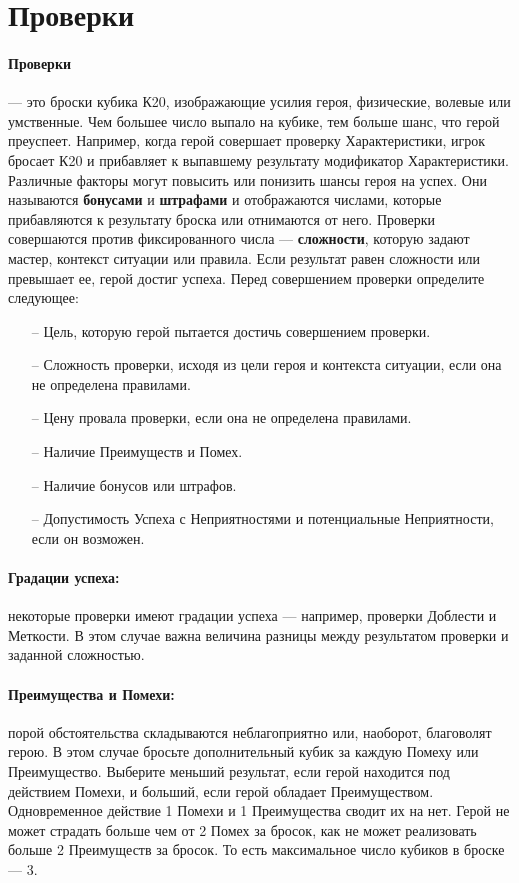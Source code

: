 \section{Проверки}
\paragraph{Проверки} — это броски кубика К20, изображающие усилия героя, физические, волевые или умственные. Чем большее число выпало на кубике, тем больше шанс, что герой преуспеет. Например, когда герой совершает проверку Характеристики, игрок бросает К20 и прибавляет к выпавшему результату модификатор Характеристики. Различные факторы могут повысить или понизить шансы героя на успех. Они называются \textbf{бонусами} и \textbf{штрафами} и отображаются числами, которые прибавляются к результату броска или отнимаются от него.
\newline Проверки совершаются против фиксированного числа — \textbf{сложности}, которую задают мастер, контекст ситуации или правила. Если результат равен сложности или превышает ее, герой достиг успеха.
\newline Перед совершением проверки определите следующее:
\begin{itemize}
\item[--]Цель, которую герой пытается достичь совершением проверки.
\item[--]Сложность проверки, исходя из цели героя и контекста
ситуации, если она не определена правилами.
\item[--]Цену провала проверки, если она не определена правилами.
\item[--]Наличие Преимуществ и Помех.
\item[--]Наличие бонусов или штрафов.
\item[--]Допустимость Успеха с Неприятностями и потенциальные Неприятности, если он возможен.
\end{itemize}
\paragraph{Градации успеха:} некоторые проверки имеют градации успеха — например, проверки Доблести и Меткости. В этом случае важна величина разницы между результатом проверки и заданной сложностью.
\paragraph{Преимущества и Помехи:} порой обстоятельства складываются неблагоприятно или, наоборот, благоволят герою. В этом случае бросьте дополнительный кубик за каждую Помеху или Преимущество. Выберите меньший результат, если герой находится под действием Помехи, и больший, если герой обладает Преимуществом. Одновременное действие 1 Помехи и 1 Преимущества сводит их на нет. Герой не может страдать больше чем от 2 Помех за бросок, как не может реализовать больше 2 Преимуществ за бросок. То есть максимальное число кубиков в броске — 3.
